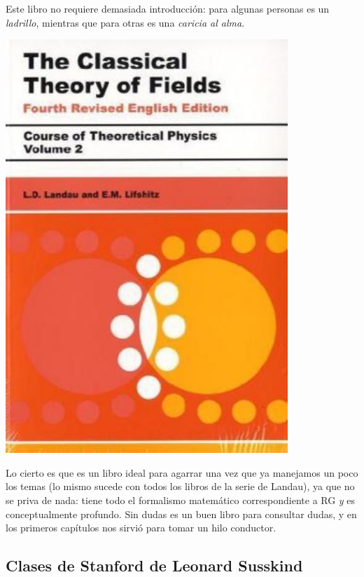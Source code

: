 Este libro no requiere demasiada introducción: para algunas personas es un \textit{ladrillo}, mientras que para otras es una \textit{caricia al alma}. 
\begin{marginfigure}
\includegraphics[width=0.8\textwidth]{Im/landau.jpg}
\end{marginfigure}
Lo cierto es que es un libro ideal para agarrar una vez que ya manejamos un poco los temas (lo mismo sucede con todos los libros de la serie de Landau), ya que no se priva de nada: tiene todo el formalismo matemático correspondiente a RG \textit{y} es conceptualmente profundo.
Sin dudas es un buen libro para consultar dudas, y en los primeros capítulos nos sirvió para tomar un hilo conductor.

\newpage

\subsection*{\textbf{Clases de Stanford} de Leonard Susskind}

